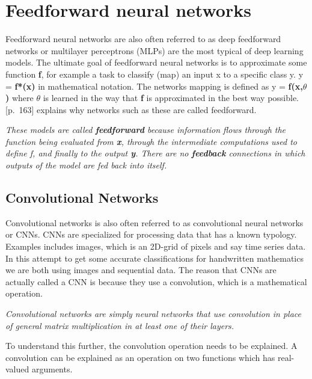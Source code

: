 \section{Feedforward neural networks}
% 
Feedforward neural networks are also often referred to as deep feedforward networks or multilayer perceptrons (MLPs) are the most typical of deep learning models. The ultimate goal of feedforward neural networks is to approximate some function \textbf{f}, for example a task to classify (map) an input x to a specific class y. y = \textbf{f*(x)} in mathematical notation. The networks mapping is defined as y = \textbf{f(x,$\theta$)} where $\theta$ is learned in the way that \textbf{f} is approximated in the best way possible. \\ 
\cite{goodfellow_deep_2016}[p.~163] explains why networks such as these are called feedforward.
\begin{displayquote}
\textit{These models are called \textbf{feedforward} because information flows through the function being evaluated from \textbf{x}, through the intermediate computations used to define f, and finally to the output \textbf{y}. There are no \textbf{feedback} connections in which outputs of the model are fed back into itself.}
\end{displayquote}



\subsection{Convolutional Networks}
% 
Convolutional networks is also often referred to as convolutional neural networks or CNNs. CNNs are specialized for processing data that has a known typology. Examples includes images, which is an 2D-grid of pixels and say time series data. In this attempt to get some accurate classifications for handwritten mathematics we are both using images and sequential data. The reason that CNNs are actually called a CNN is because they use a convolution, which is a mathematical operation.
\begin{displayquote}
 \textit{Convolutional networks are simply neural networks that use convolution in place of general matrix multiplication in at least one of their layers.}
\end{displayquote}
To understand this further, the convolution operation needs to be explained. A convolution can be explained as an operation on two functions which has real-valued arguments.\\ 


